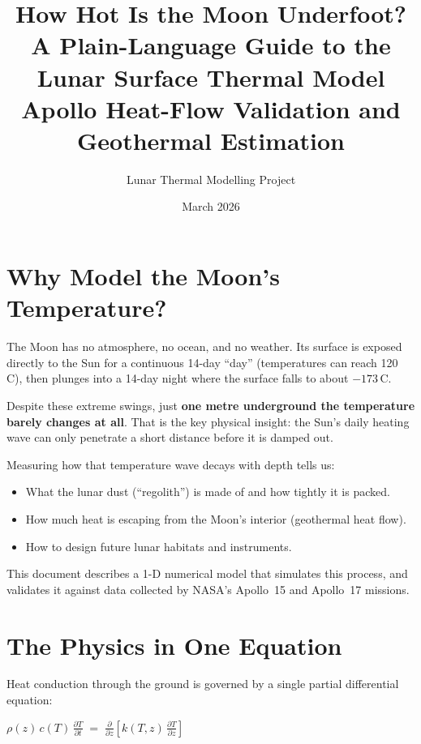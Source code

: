 \documentclass[12pt, a4paper]{article}
\title{%
  \textbf{How Hot Is the Moon Underfoot?}\\[0.4em]
  \large A Plain-Language Guide to the Lunar Surface Thermal Model\\[0.2em]
  \normalsize Apollo Heat-Flow Validation and Geothermal Estimation
}
\author{Lunar Thermal Modelling Project}
\date{March 2026}
\newcommand{\eqbox}[1]{%
  \begin{center}
    \colorbox{boxgray}{\parbox{0.88\linewidth}{\vspace{4pt}\centering#1\vspace{4pt}}}
  \end{center}
}
\begin{document}
\maketitle
\tableofcontents
\newpage

\section{Why Model the Moon's Temperature?}

The Moon has no atmosphere, no ocean, and no weather.  Its surface is exposed
directly to the Sun for a continuous 14-day ``day'' (temperatures can reach
120\,\textdegree{}C), then plunges into a 14-day night where the surface falls
to about $-173$\,\textdegree{}C.

Despite these extreme swings, just \textbf{one metre underground the temperature
barely changes at all}.  That is the key physical insight: the Sun's daily heating
wave can only penetrate a short distance before it is damped out.

Measuring how that temperature wave decays with depth tells us:
\begin{itemize}
  \item What the lunar dust (``regolith'') is made of and how tightly it is packed.
  \item How much heat is escaping from the Moon's interior (geothermal heat flow).
  \item How to design future lunar habitats and instruments.
\end{itemize}

This document describes a 1-D numerical model that simulates this process, and
validates it against data collected by NASA's Apollo~15 and Apollo~17 missions.

\section{The Physics in One Equation}

Heat conduction through the ground is governed by a single partial differential
equation:

\eqbox{
  $\displaystyle
    \rho(z)\, c(T)\,\frac{\partial T}{\partial t}
    \;=\;
    \frac{\partial}{\partial z}\!\left[k(T,z)\,\frac{\partial T}{\partial z}\right]$
}
\end{document}

